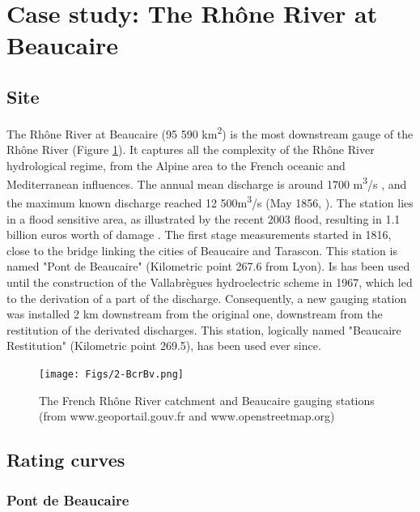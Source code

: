 \documentclass[11pt]{article}
\begin{document}
\section{Case study: The Rhône River at Beaucaire}
\label{sec:Bcr}
    \subsection{Site}
    
    The Rhône River at Beaucaire (95 590 km\textsuperscript{2}) is the most downstream gauge of the Rhône River (Figure \ref{fig:locstations}). It captures all the complexity of the Rhône River hydrological regime, from the Alpine area to the French oceanic and Mediterranean influences. The annual mean discharge is around 1700 m\textsuperscript{3}/s \citep{bard_actualisation_2018}, and the maximum known discharge reached 12 500m\textsuperscript{3}/s (May 1856, \citet{lang_les_2014}). The station lies in a flood sensitive area, as illustrated by the recent 2003 flood, resulting in 1.1 billion euros worth of damage \citep{lang_les_2014}. 
    The first stage measurements started in 1816, close to the bridge linking the cities of Beaucaire and Tarascon. This station is named "Pont de Beaucaire" (Kilometric point 267.6 from Lyon). Is has been used until the construction of the Vallabrègues hydroelectric scheme in 1967, which led to the derivation of a part of the discharge. Consequently, a new gauging station was installed 2 km downstream from the original one, downstream from the restitution of the derivated discharges. This station, logically named "Beaucaire Restitution" (Kilometric point 269.5), has been used ever since.

    \begin{figure}[h]
        \centering
        \texttt{[image: Figs/2-BcrBv.png]}
        \caption{The French Rhône River catchment and Beaucaire gauging stations (from www.geoportail.gouv.fr and www.openstreetmap.org)}
        \label{fig:locstations}
    \end{figure}
    
        \subsection{Rating curves}
        \label{sec:prior_elicitation}
        \subsubsection{Pont de Beaucaire}
        
\end{document}
